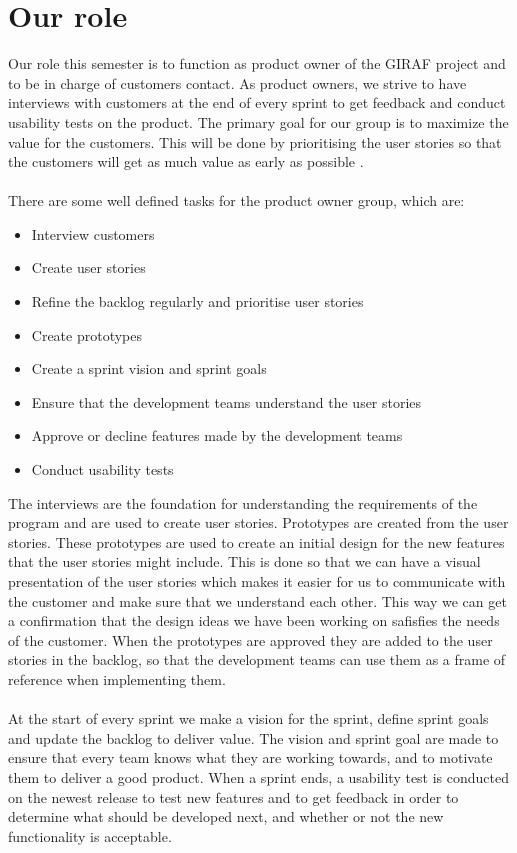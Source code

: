 \section{Our role}
Our role this semester is to function as product owner of the GIRAF project and to be in charge of customers contact.
As product owners, we strive to have interviews with customers at the end of every sprint to get feedback and conduct usability tests on the product.
The primary goal for our group is to maximize the value for the customers. 
This will be done by prioritising the user stories so that the customers will get as much value as early as possible \autocite{TheScrumGuide}.\\
\\
There are some well defined tasks for the product owner group, which are:
\begin{itemize}
    \item Interview customers
    \item Create user stories    
    \item Refine the backlog regularly and prioritise user stories
    \item Create prototypes
    \item Create a sprint vision and sprint goals
    \item Ensure that the development teams understand the user stories
    \item Approve or decline features made by the development teams
    \item Conduct usability tests
\end{itemize}
\noindent
The interviews are the foundation for understanding the requirements of the program and are used to create user stories. 
Prototypes are created from the user stories.
These prototypes are used to create an initial design for the new features that the user stories might include. 
This is done so that we can have a visual presentation of the user stories which makes it easier for us to communicate with the customer and make sure that we understand each other. 
This way we can get a confirmation that the design ideas we have been working on safisfies the needs of the customer.
When the prototypes are approved they are added to the user stories in the backlog, so that the development teams can use them as a frame of reference when implementing them.
\\\\
At the start of every sprint we make a vision for the sprint, define sprint goals and update the backlog to deliver value. 
The vision and sprint goal are made to ensure that every team knows what they are working towards, and to motivate them to deliver a good product.
When a sprint ends, a usability test is conducted on the newest release to test new features and to get feedback in order to determine what should be developed next, and whether or not the new functionality is acceptable.
